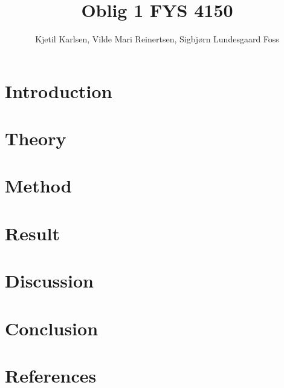 


\title{Oblig 1 FYS 4150}
\author{Kjetil Karlsen, Vilde Mari Reinertsen, Sigbjørn Lundesgaard Foss}




\maketitle

\begin{abstract}

\end{abstract}

\section{Introduction}


\section{Theory}


\section{Method}


\section{Result}


\section{Discussion}


\section{Conclusion}


\section{References}

